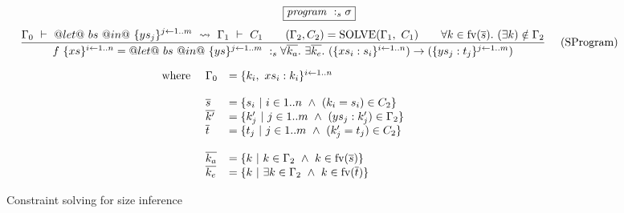 
\begin{figure*}
\footnotesize
$$
\fbox{$
 \SizeF {\program}{\sigma}
$}
$$
$$
\ruleI  {
          \SizeL{\Gamma_0}
                {@let@~ bs~ @in@~ \{ ys_j \}^{j \gets 1 .. m}}
                {\Gamma_1}{C_1}
\qquad
  (\Gamma_2,C_2) = \textrm{SOLVE}(\Gamma_1,~ C_1)
  \qquad
          \forall k \in \fv(\ov{s}).~
          (\exists k) \notin \Gamma_2
        }
        {
        \begin{array}{c}
        \SizeF{f~ \{xs\}^{i \gets 1..n}
                        = @let@~ bs~ @in@~ \{ys\}^{j \gets 1..m}
                }
                { \forall \overline{k_a}.~ 
                  \exists \overline{k_e}.~
                        (\{ xs_i : s_i \}^{i \gets 1..n}) \to
                        (\{ ys_j : t_j \}^{j \gets 1..m})
                }
\\[1em]
\begin{array}{lll}
\mbox{where }
  & \Gamma_0 & = \{k_i,~ xs_i : k_i \}^{ i \gets 1 .. n }
\\
\\
  & \ov{s} & = \{ s_i ~|~ i \in 1..n  ~\wedge~ (k_i = s_i) \in C_2 \}
\\
 & \ov{k'} & = \{ k'_j ~|~ j \in 1..m ~\wedge~ (ys_j : k_j') \in \Gamma_2 \}
\\
  & \ov{t} & = \{ t_j ~|~ j \in 1..m  ~\wedge~ (k_j' = t_j ) \in C_2 \}
\\
\\
 & \ov{k_a} & = \{ k ~|~ k         \in \Gamma_2 ~\wedge~ k \in \fv(\ov{s}) \}  
\\
 & \ov{k_e} & = \{ k ~|~ \exists k \in \Gamma_2 ~\wedge~ k \in \fv(\ov{t}) \}
\end{array}
\end{array}
        }
\quad
\textrm{(SProgram)}
$$

\caption{Constraint solving for size inference}
\label{clustering:f:ConstraintSolving}
\end{figure*}

